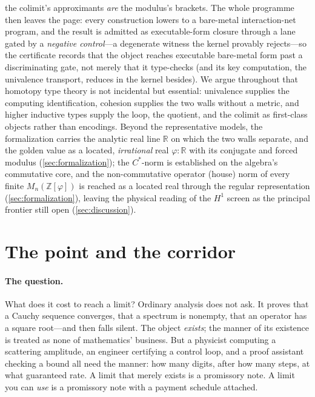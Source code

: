 \documentclass[11pt,letterpaper]{article}
\theoremstyle{plain}
\theoremstyle{definition}
\theoremstyle{remark}
\newcommand{\ZZ}{\mathbb{Z}}
\newcommand{\RR}{\mathbb{R}}
\newcommand{\Zphi}{\ZZ[\varphi]}
\begin{document}
\begin{titlingpage}
\begin{minipage}{0.90\textwidth}
the colimit's approximants \emph{are} the modulus's brackets. The whole programme
then leaves the page: every construction lowers to a bare-metal interaction-net
program, and the result is admitted as executable-form closure through a lane
gated by a \emph{negative control}---a degenerate witness the kernel provably
rejects---so the certificate records that the object reaches executable bare-metal
form past a discriminating gate, not merely that it type-checks (and its key
computation, the univalence transport, reduces in the kernel besides). We argue
throughout that homotopy type theory is not incidental but
essential: univalence supplies the computing identification, cohesion supplies the
two walls without a metric, and higher inductive types supply the loop, the
quotient, and the colimit as first-class objects rather than encodings. Beyond the
representative models, the formalization carries the analytic real line $\RR$ on
which the two walls separate, and the golden value as a located, \emph{irrational}
real $\varphi:\RR$ with its conjugate and forced modulus
(\cref{sec:formalization}); the $C^\ast$-norm is established on the algebra's
commutative core, and the non-commutative operator (house) norm of every finite
$M_n(\Zphi)$ is reached as a located real through the regular representation
(\cref{sec:formalization}), leaving the physical reading of the $H^1$ screen as the
principal frontier still open (\cref{sec:discussion}).
\end{minipage}

\end{titlingpage}

\section{The point and the corridor}\label{sec:intro}

\paragraph{The question.}
What does it cost to reach a limit? Ordinary analysis does not ask. It proves
that a Cauchy sequence converges, that a spectrum is nonempty, that an operator
has a square root---and then falls silent. The object \emph{exists}; the manner
of its existence is treated as none of mathematics' business. But a physicist
computing a scattering amplitude, an engineer certifying a control loop, and a
proof assistant checking a bound all need the manner: how many digits, after how
many steps, at what guaranteed rate. A limit that merely exists is a promissory
note. A limit you can \emph{use} is a promissory note with a payment schedule
attached.
\end{document}

